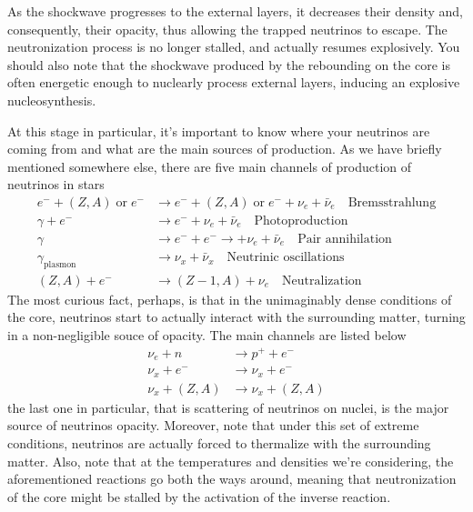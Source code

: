 \par As the shockwave progresses to the external layers, it decreases their density and, consequently, their opacity, thus allowing the trapped neutrinos to escape. The neutronization process is no longer stalled, and actually resumes explosively. You should also note that the shockwave produced by the rebounding on the core is often energetic enough to nuclearly process external layers, inducing an explosive nucleosynthesis.

\begin{tcolorbox}[enhanced,attach boxed title to top center={yshift=-3mm,yshifttext=-1mm},
colback=blue!5!white,colframe=blue!75!black,colbacktitle=blue!80!black,
title=Know Your Neutrinos,
boxed title style={size=small,colframe=blue!50!black}]
    At this stage in particular, it's important to know where your neutrinos are coming from and what are the main sources of production. As we have briefly mentioned somewhere else, there are five main channels of production of neutrinos in stars
    \begin{align*}
        e^{-} + (Z, A)\;\text{or}\;e^{-} & \to e^{-} + (Z,A)\;\text{or}\;e^{-} +\nu_{e}+\bar{\nu}_{e} \quad \text{Bremsstrahlung}\\
        \gamma + e^{-} & \to e^{-} +\nu_{e}+\bar{\nu}_{e} \quad \text{Photoproduction}\\
        \gamma & \to e^{-} + e^{-} \to +\nu_{e}+\bar{\nu}_{e} \quad \text{Pair annihilation}\\
        \gamma_{\text{plasmon}} & \to \nu_{x} + \bar{\nu}_{x} \quad \text{Neutrinic oscillations} \\
        (Z,A) + e^{-} & \to (Z-1,A)+\nu_{e} \quad \text{Neutralization}
    \end{align*}
    The most curious fact, perhaps, is that in the unimaginably dense conditions of the core, neutrinos start to actually interact with the surrounding matter, turning in a non-negligible souce of opacity. The main channels are listed below
    \begin{align*}
        \nu_{e} + n &\to p^{+} + e^{-} \\
        \nu_{x} + e^{-} &\to \nu_{x} + e^{-}\\
        \nu_{x} + (Z,A) &\to \nu_{x} + (Z,A)
    \end{align*}
    the last one in particular, that is scattering of neutrinos on nuclei, is the major source of neutrinos opacity. Moreover, note that under this set of extreme conditions, neutrinos are actually forced to thermalize with the surrounding matter. Also, note that at the temperatures and densities we're considering, the aforementioned reactions go both the ways around, meaning that neutronization of the core might be stalled by the activation of the inverse reaction.
\end{tcolorbox}

